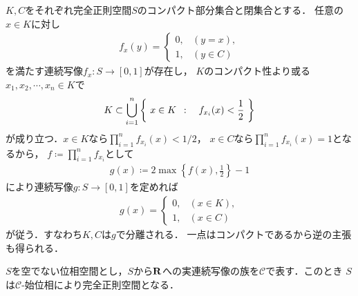 	\begin{prf}
		$K,C$をそれぞれ完全正則空間$S$のコンパクト部分集合と閉集合とする．
		任意の$x \in K$に対し
		\begin{align}
			f_x(y) = 
			\begin{cases}
				0, & (y=x), \\
				1, & (y \in C)
			\end{cases} 
		\end{align}
		を満たす連続写像$f_x:S \longrightarrow [0,1]$が存在し，
		$K$のコンパクト性より或る$x_1,x_2,\cdots,x_n \in K$で
		\begin{align}
			K \subset \bigcup_{i=1}^n \left\{\ x \in K\ \, : \quad f_{x_i}(x) < \frac{1}{2}\ \right\}
		\end{align}
		が成り立つ．$x \in K$なら$\prod_{i=1}^n f_{x_i}(x) < 1/2$，
		$x \in C$なら$\prod_{i=1}^n f_{x_i}(x) = 1$となるから，
		$f \coloneqq \prod_{i=1}^n f_{x_i}$として
		\begin{align}
			g(x) \coloneqq 2 \operatorname{max}\left\{f(x),\frac{1}{2}\right\} - 1
		\end{align}
		により連続写像$g:S \longrightarrow [0,1]$を定めれば
		\begin{align}
			g(x) = 
			\begin{cases}
				0, & (x \in K), \\
				1, & (x \in C)
			\end{cases}
		\end{align}
		が従う．すなわち$K,C$は$g$で分離される．
		一点はコンパクトであるから逆の主張も得られる．
		\QED
	\end{prf}
	
	\begin{screen}
		\begin{thm}[実連続写像の族が生成する始位相は完全正則]
		\label{thm:initial_topology_of_continuous_functions_is_completely_regular}
			$S$を空でない位相空間とし，$S$から$\mathbf{R}$への実連続写像の族を$\mathscr{C}$で表す．このとき
			$S$は$\mathscr{C}$-始位相により完全正則空間となる．
		\end{thm}
	\end{screen}
	
